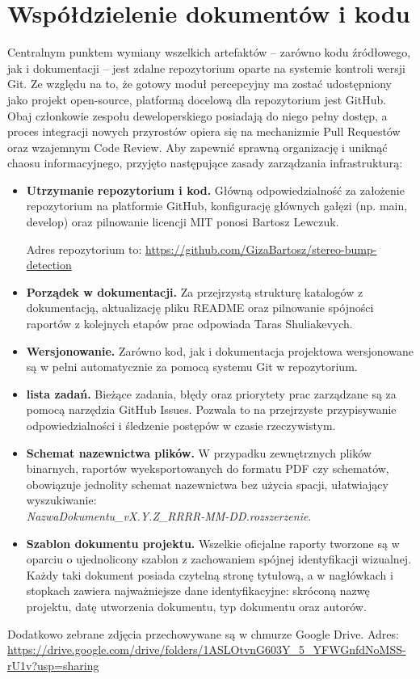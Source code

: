 \documentclass[11pt, a4paper]{article}
\begin{document}
\section{Współdzielenie dokumentów i kodu}
Centralnym punktem wymiany wszelkich artefaktów – zarówno kodu źródłowego, jak i dokumentacji – jest zdalne repozytorium oparte na systemie kontroli wersji Git. Ze względu na to, że gotowy moduł percepcyjny ma zostać udostępniony jako projekt open-source, platformą docelową dla repozytorium jest GitHub. Obaj członkowie zespołu deweloperskiego posiadają do niego pełny dostęp, a proces integracji nowych przyrostów opiera się na mechanizmie Pull Requestów oraz wzajemnym Code Review. Aby zapewnić sprawną organizację i uniknąć chaosu informacyjnego, przyjęto następujące zasady zarządzania infrastrukturą:
\begin{itemize}
    \item \textbf{Utrzymanie repozytorium i kod.} Główną odpowiedzialność za założenie repozytorium na platformie GitHub, konfigurację głównych gałęzi (np. main, develop) oraz pilnowanie licencji MIT ponosi Bartosz Lewczuk. 
    
    Adres repozytorium to: \url{https://github.com/GizaBartosz/stereo-bump-detection}
    \item \textbf{Porządek w dokumentacji.} Za przejrzystą strukturę katalogów z dokumentacją, aktualizację pliku README oraz pilnowanie spójności raportów z kolejnych etapów prac odpowiada Taras Shuliakevych.
    \item \textbf{Wersjonowanie.} Zarówno kod, jak i dokumentacja projektowa wersjonowane są w pełni automatycznie za pomocą systemu Git w repozytorium. 
    \item \textbf{lista zadań.} Bieżące zadania, błędy oraz priorytety prac zarządzane są za pomocą narzędzia GitHub Issues. Pozwala to na przejrzyste przypisywanie odpowiedzialności i śledzenie postępów w czasie rzeczywistym.
    \item \textbf{Schemat nazewnictwa plików.} W przypadku zewnętrznych plików binarnych, raportów wyeksportowanych do formatu PDF czy schematów, obowiązuje jednolity schemat nazewnictwa bez użycia spacji, ułatwiający wyszukiwanie: \\\textit{NazwaDokumentu\_vX.Y.Z\_RRRR-MM-DD.rozszerzenie}.
    \item \textbf{Szablon dokumentu projektu.} Wszelkie oficjalne raporty tworzone są w oparciu o ujednolicony szablon z zachowaniem spójnej identyfikacji wizualnej. Każdy taki dokument posiada czytelną stronę tytułową, a w nagłówkach i stopkach zawiera najważniejsze dane identyfikacyjne: skróconą nazwę projektu, datę utworzenia dokumentu, typ dokumentu oraz autorów.
\end{itemize}
Dodatkowo zebrane zdjęcia przechowywane są w chmurze Google Drive. 
Adres: \url{https://drive.google.com/drive/folders/1ASLOtvnG603Y_5_YFWGnfdNoMSS-rU1v?usp=sharing}
\end{document}
